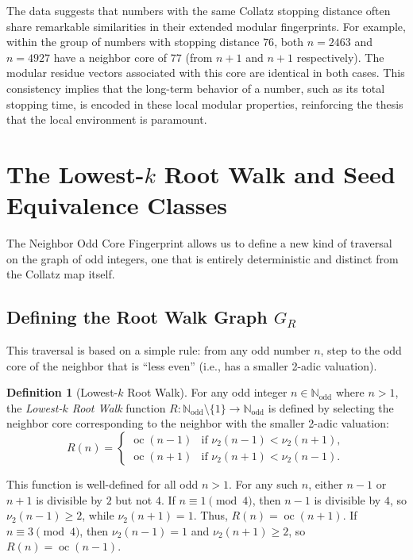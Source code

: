 \documentclass[12pt]{article}
\theoremstyle{plain}
\theoremstyle{definition}
\newtheorem{definition}[theorem]{Definition}
\begin{document}
The data suggests that numbers with the same Collatz stopping distance often share remarkable similarities in their extended modular fingerprints. For example, within the group of numbers with stopping distance $76$, both $n=2463$ and $n=4927$ have a neighbor core of $77$ (from $n+1$ and $n+1$ respectively). The modular residue vectors associated with this core are identical in both cases. This consistency implies that the long-term behavior of a number, such as its total stopping time, is encoded in these local modular properties, reinforcing the thesis that the local environment is paramount.

\section{The Lowest-$k$ Root Walk and Seed Equivalence Classes}

The Neighbor Odd Core Fingerprint allows us to define a new kind of traversal on the graph of odd integers, one that is entirely deterministic and distinct from the Collatz map itself.

\subsection{Defining the Root Walk Graph $G_R$}

This traversal is based on a simple rule: from any odd number $n$, step to the odd core of the neighbor that is ``less even'' (i.e., has a smaller 2-adic valuation).

\begin{definition}[Lowest-$k$ Root Walk]
For any odd integer $n \in \mathbb{N}_{\text{odd}}$ where $n > 1$, the \emph{Lowest-$k$ Root Walk} function $R: \mathbb{N}_{\text{odd}} \setminus \{1\} \to \mathbb{N}_{\text{odd}}$ is defined by selecting the neighbor core corresponding to the neighbor with the smaller 2-adic valuation:
\[
R(n) =
\begin{cases}
\operatorname{oc}(n-1) & \text{if } \nu_2(n-1) < \nu_2(n+1), \\
\operatorname{oc}(n+1) & \text{if } \nu_2(n+1) < \nu_2(n-1).
\end{cases}
\]
\end{definition}

This function is well-defined for all odd $n > 1$. For any such $n$, either $n-1$ or $n+1$ is divisible by $2$ but not $4$. If $n \equiv 1 \pmod{4}$, then $n-1$ is divisible by $4$, so $\nu_2(n-1) \geq 2$, while $\nu_2(n+1) = 1$. Thus, $R(n) = \operatorname{oc}(n+1)$. If $n \equiv 3 \pmod{4}$, then $\nu_2(n-1) = 1$ and $\nu_2(n+1) \geq 2$, so $R(n) = \operatorname{oc}(n-1)$.
\end{document}
